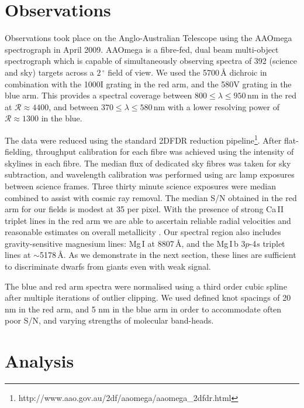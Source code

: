 \documentclass[10pt,apjl]{emulateapj}
\begin{document}
\section{Observations}
\label{sec:observations}

Observations took place on the Anglo-Australian Telescope using the AAOmega spectrograph in April 2009. AAOmega is a fibre-fed, dual beam multi-object spectrograph which is capable of simultaneously observing spectra of 392 (science and sky) targets across a $2\,^\circ$ field of view. We used the 5700\,{\AA} dichroic in combination with the 1000I grating in the red arm, and the 580V grating in the blue arm. This provides a spectral coverage between $800 \leq \lambda \leq 950$\,nm in the red at $\mathcal{R} \approx 4400$, and between $370 \leq \lambda \leq 580$\,nm with a lower resolving power of $\mathcal{R} \approx 1300$ in the blue.

The data were reduced using the standard \textsc{2DFDR} reduction pipeline\footnote{http://www.aao.gov.au/2df/aaomega/aaomega\_2dfdr.html}. After flat-fielding, throughput calibration for each fibre was achieved using the intensity of skylines in each fibre. The median flux of dedicated sky fibres was taken for sky subtraction, and wavelength calibration was performed using arc lamp exposures between science frames. Three thirty minute science exposures were median combined to assist with cosmic ray removal. The median S/N obtained in the red arm for our fields is modest at 35 per pixel. With the presence of strong Ca\,\textsc{II} triplet lines in the red arm we are able to ascertain reliable radial velocities and reasonable estimates on overall metallicity \citep[][and references therein]{Starkenburg_et-al_2010}. Our spectral region also includes gravity-sensitive magnesium lines: Mg\,\textsc{I} at 8807\,{\AA}, and the Mg\,\textsc{I}\,b 3$p$-4$s$ triplet lines at $\sim$5178\,{\AA}. As we demonstrate in the next section, these lines are sufficient to discriminate dwarfs from giants even with weak signal.

The blue and red arm spectra were normalised using a third order cubic spline after multiple iterations of outlier clipping. We used defined knot spacings of 20 nm in the red arm, and 5 nm in the blue arm in order to accommodate often poor S/N, and varying strengths of molecular band-heads.

\section{Analysis}
\label{sec:analysis}
\end{document}
